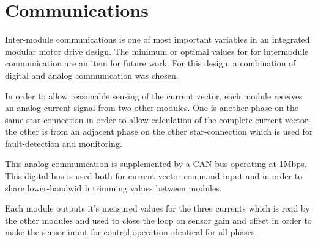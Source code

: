 \section{Communications}
Inter-module communications is one of most important variables in an
integrated modular motor drive design. The minimum or optimal values for
for intermodule communication are an item for future work. For this design, a
combination of digital and analog communication was chosen.

In order to allow reasonable sensing of the current vector, each module
receives an analog current signal from two other modules.  One is another
phase on the same star-connection in order to allow calculation of the
complete current vector; the other is from an adjacent phase on the other
star-connection which is used for fault-detection and monitoring.

This analog communication is supplemented by a CAN bus operating at 1Mbps.
This digital bus is used both for current vector command input and in order to
share lower-bandwidth trimming values between modules.

Each module outputs it's measured values for the three currents which is read
by the other modules and used to close the loop on sensor gain and offset in
order to make the sensor input for control operation identical for all phases.
